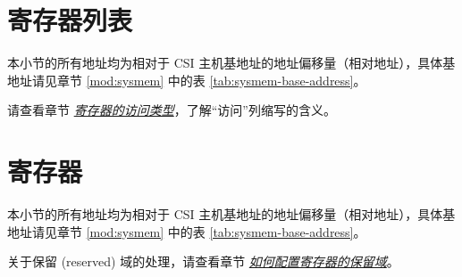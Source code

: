 \documentclass[main\_\_CN.tex]{subfiles}
\begin{document}


\newpage
\hypertarget{mipicsi-reg-summ}{}
\section{寄存器列表}
\label{sec:mipicsi-reg-summ}

本小节的所有地址均为相对于 CSI 主机基地址的地址偏移量（相对地址），具体基地址请见章节 \ref{mod:sysmem} \textit{} 中的表 \ref{tab:sysmem-base-address}。

请查看章节 \hyperref[glossary-access-types]{\textit{寄存器的访问类型}}，了解“访问”列缩写的含义。






\newpage
\section{寄存器}

本小节的所有地址均为相对于 CSI 主机基地址的地址偏移量（相对地址），具体基地址请见章节 \ref{mod:sysmem} \textit{} 中的表 \ref{tab:sysmem-base-address}。

关于保留 (reserved) 域的处理，请查看章节 \hyperref[programming-reserved-field]{\textit{如何配置寄存器的保留域}}。


\end{document}
